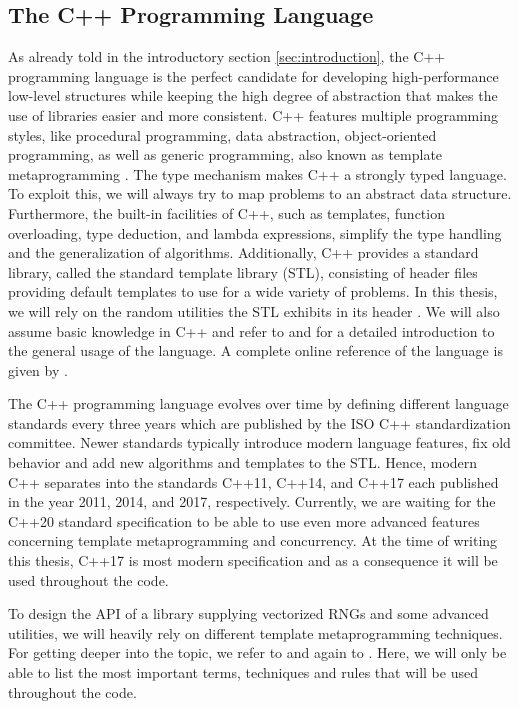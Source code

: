 \documentclass{stdlocal}
\begin{document}
  \subsection{The C++ Programming Language} %
  \label{sub:the_c_programming_language}
    As already told in the introductory section \ref{sec:introduction}, the C++ programming language is the perfect candidate for developing high-performance low-level structures while keeping the high degree of abstraction that makes the use of libraries easier and more consistent.
    C++ features multiple programming styles, like procedural programming, data abstraction, object-oriented programming, as well as generic programming, also known as template metaprogramming \autocite{stroustrup2014,vandevoorde2018}.
    The type mechanism makes C++ a strongly typed language.
    To exploit this, we will always try to map problems to an abstract data structure.
    Furthermore, the built-in facilities of C++, such as templates, function overloading, type deduction, and lambda expressions, simplify the type handling and the generalization of algorithms.
    Additionally, C++ provides a standard library, called the standard template library (STL), consisting of header files providing default templates to use for a wide variety of problems.
    In this thesis, we will rely on the random utilities the STL exhibits in its header .
    We will also assume basic knowledge in C++ and refer to \textcite{stroustrup2014} and \textcite{meyers2014} for a detailed introduction to the general usage of the language.
    A complete online reference of the language is given by \textcite{cppreference}.

    The C++ programming language evolves over time by defining different language standards every three years which are published by the ISO C++ standardization committee.
    Newer standards typically introduce modern language features, fix old behavior and add new algorithms and templates to the STL.
    Hence, modern C++ separates into the standards C++11, C++14, and C++17 each published in the year 2011, 2014, and 2017, respectively.
    Currently, we are waiting for the C++20 standard specification to be able to use even more advanced features concerning template metaprogramming and concurrency.
    At the time of writing this thesis, C++17 is most modern specification and as a consequence it will be used throughout the code.
    \autocite{stroustrup2014,meyers2014,vandevoorde2018}

    To design the API of a library supplying vectorized RNGs and some advanced utilities, we will heavily rely on different template metaprogramming techniques.
    For getting deeper into the topic, we refer to \textcite{vandevoorde2018} and again to \textcite{meyers2014}.
    Here, we will only be able to list the most important terms, techniques and rules that will be used throughout the code.
\end{document}
